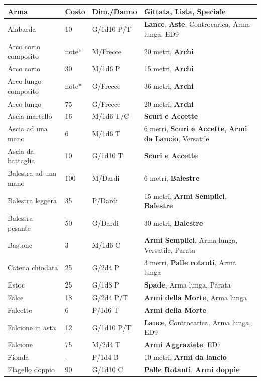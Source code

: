 \noindent\begin{xltabular}{\linewidth}{lllX}
	\toprule
{}\textbf{Arma}&\textbf{Costo}&\textbf{Dim./Danno} & \textbf{Gittata, Lista, Speciale}\\
\toprule
Alabarda& 10 & G/1d10 P/T& \textbf{Lance}, \textbf{Aste}, Controcarica, Arma lunga, ED9 \\
Arco corto composito& note*& M/Frecce& 20 metri, \textbf{Archi}\\
Arco corto& 30 & M/1d6 P& 15 metri, \textbf{Archi}\\
Arco lungo composito& note*& G/Frecce& 36 metri, \textbf{Archi}\\
Arco lungo& 75 & G/Frecce& 20 metri, \textbf{Archi}\\
Ascia martello& 16 & M/1d6 T/C& \textbf{Scuri e Accette}\\
Ascia ad una mano& 6 & M/1d6 T& 6 metri, \textbf{Scuri e Accette}, \textbf{Armi da Lancio}, Versatile\\
Ascia da battaglia& 10 & G/1d10 T&\textbf{Scuri e Accette}\\
Balestra ad una mano& 100& M/Dardi& 6 metri, \textbf{Balestre}\\
Balestra leggera& 35 & P/Dardi& 15 metri, \textbf{Armi Semplici}, \textbf{Balestre}\\
Balestra pesante& 50 & G/Dardi& 30 metri, \textbf{Balestre}\\
Bastone& 3& M/1d6 C& \textbf{Armi Semplici}, Arma lunga, Versatile, Parata\\
Catena chiodata& 25 & G/2d4 P& 3 metri, \textbf{Palle rotanti}, Arma lunga\\
Estoc& 25& G/1d8 P& \textbf{Spade}, Arma lunga, Parata\\
Falce& 18 & G/2d4 P/T& \textbf{Armi della Morte}, Arma lunga\\
Falcetto& 6& P/1d6 T& \textbf{Armi della Morte}\\
Falcione in asta& 12 & G/1d10 P/T& \textbf{Lance}, Controcarica, Arma lunga, ED9\\
Falcione& 75 & M/2d4 T& \textbf{Armi Aggraziate}, ED7\\
Fionda& -& P/1d4 B& 10 metri, \textbf{Armi da lancio}\\
Flagello doppio& 90 & G/1d10 C& \textbf{Palle Rotanti}, \textbf{Armi doppie}\\

\end{xltabular}
